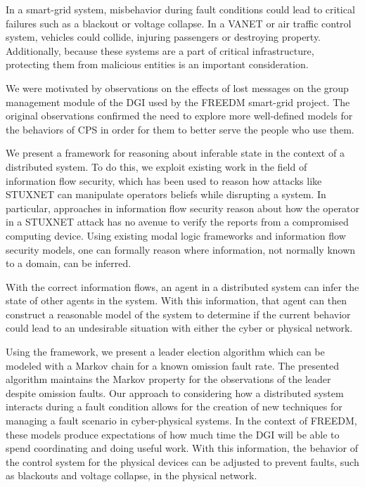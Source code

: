 In a smart-grid system, misbehavior during fault conditions could lead to critical failures such as a blackout or voltage collapse.
In a \ac{VANET} or air traffic control system, vehicles could collide, injuring passengers or destroying property.
Additionally, because these systems are a part of critical infrastructure, protecting them from malicious entities is an important consideration.

We were motivated by observations on the effects of lost messages on the group management module of the \ac{DGI} used by the \ac{FREEDM} smart-grid project.
The original observations confirmed the need to explore more well-defined models for the behaviors of \ac{CPS} in order for them to better serve the people who use them.

We present a framework for reasoning about inferable state in the context of a distributed system.
To do this, we exploit existing work in the field of information flow security, which has been used to reason how attacks like STUXNET can manipulate operators beliefs while disrupting a system\cite{STUXNET}.
In particular, approaches in information flow security reason about how the operator in a STUXNET attack has no avenue to verify the reports from a compromised computing device.
Using existing modal logic frameworks and information flow security models\cite{Howser2012}\cite{STUXNET}\cite{Howser2013}, one can formally reason where information, not normally known to a domain, can be inferred.

With the correct information flows, an agent in a distributed system can infer the state of other agents in the system.
With this information, that agent can then construct a reasonable model of the system to determine if the current behavior could lead to an undesirable situation with either the cyber or physical network.

Using the framework, we present a leader election algorithm which can be modeled with a Markov chain for a known omission fault\cite{OMISSIONFAILURES} rate.
The presented algorithm maintains the Markov property for the observations of the leader despite omission faults.
Our approach to considering how a distributed system interacts during a fault condition allows for the creation of new techniques for managing a fault scenario in cyber-physical systems.
In the context of \ac{FREEDM}, these models produce expectations of how much time the DGI will be able to spend coordinating and doing useful work.
With this information, the behavior of the control system for the physical devices can be adjusted to prevent faults, such as blackouts and voltage collapse, in the physical network.


